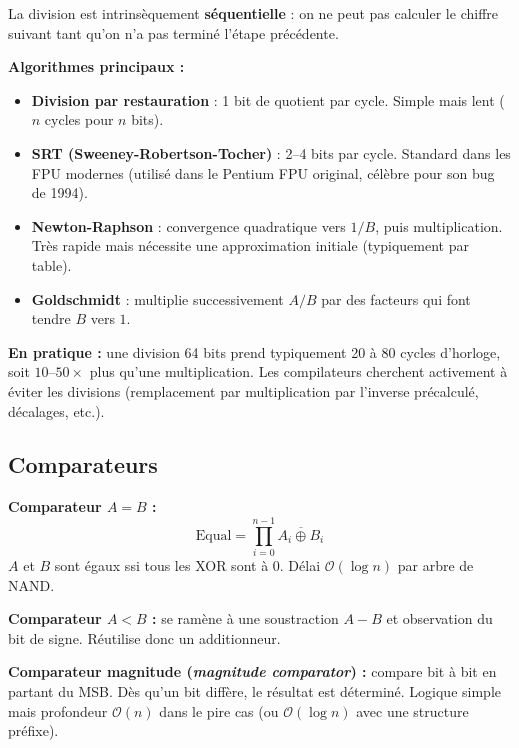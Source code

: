\documentclass[12pt,a4paper,twoside]{book}
\begin{document}
\begin{formule}
La division est intrinsèquement \textbf{séquentielle} : on ne peut pas calculer le chiffre suivant tant qu'on n'a pas terminé l'étape précédente.

\textbf{Algorithmes principaux :}
\begin{itemize}[nosep]
\item \textbf{Division par restauration} : 1 bit de quotient par cycle. Simple mais lent ($n$ cycles pour $n$ bits).
\item \textbf{SRT (Sweeney-Robertson-Tocher)} : 2--4 bits par cycle. Standard dans les FPU modernes (utilisé dans le Pentium FPU original, célèbre pour son bug de 1994).
\item \textbf{Newton-Raphson} : convergence quadratique vers $1/B$, puis multiplication. Très rapide mais nécessite une approximation initiale (typiquement par table).
\item \textbf{Goldschmidt} : multiplie successivement $A/B$ par des facteurs qui font tendre $B$ vers $1$.
\end{itemize}

\textbf{En pratique :} une division 64 bits prend typiquement 20 à 80 cycles d'horloge, soit $10$--$50\times$ plus qu'une multiplication. Les compilateurs cherchent activement à éviter les divisions (remplacement par multiplication par l'inverse précalculé, décalages, etc.).
\end{formule}

\subsection{Comparateurs}

\begin{formule}
\textbf{Comparateur $A = B$ :}
\[
\text{Equal} = \prod_{i=0}^{n-1} \overline{A_i \oplus B_i}
\]
$A$ et $B$ sont égaux ssi tous les XOR sont à 0. Délai $\mathcal{O}(\log n)$ par arbre de NAND.

\textbf{Comparateur $A < B$ :} se ramène à une soustraction $A - B$ et observation du bit de signe. Réutilise donc un additionneur.

\textbf{Comparateur magnitude (\textit{magnitude comparator}) :} compare bit à bit en partant du MSB. Dès qu'un bit diffère, le résultat est déterminé. Logique simple mais profondeur $\mathcal{O}(n)$ dans le pire cas (ou $\mathcal{O}(\log n)$ avec une structure préfixe).
\end{formule}

\end{document}
